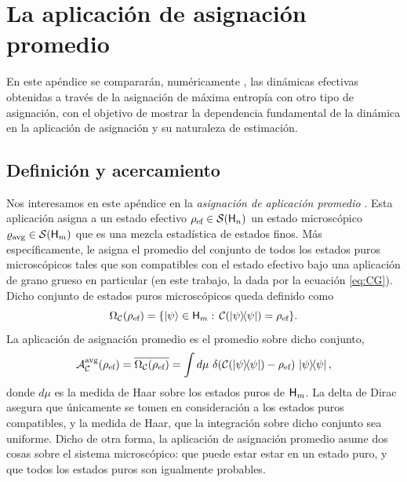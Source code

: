 \chapter{La aplicación de asignación promedio}\label{sec:AVG}

En este apéndice se compararán, numéricamente , las dinámicas efectivas obtenidas a través de la asignación de máxima entropía con otro tipo de asignación, con el objetivo de mostrar la dependencia fundamental de la dinámica en la aplicación de asignación y su naturaleza de estimación.

\section{Definición y acercamiento}




Nos interesamos en este apéndice en la \textit{asignación de aplicación promedio} \cite{Macro-To-Micro}. Esta aplicación asigna a un estado efectivo $\rho_{\text{ef}} \in \mathcal{S}({\sf H}_{n})$ un estado microscópico $\varrho_{\text{avg}} \in \mathcal{S}({\sf H}_{m})$ que es una mezcla estadística de estados finos. Más específicamente, le asigna el promedio del conjunto de todos los estados puros microscópicos tales que son compatibles con el estado efectivo bajo una aplicación de grano grueso en particular (en este trabajo, la dada por la ecuación \ref{eq:CG}). Dicho conjunto de estados puros microscópicos queda definido como
\begin{equation}\label{eq:Omega}
    \Omega_{\mcC}(\rho_{\ef}) = \{\ket{\psi}\in\hilbert_{m}:\, \mcC(\dyad{\psi}) = \rho_{\ef}  \}.
\end{equation}
La aplicación de asignación promedio es el promedio sobre dicho conjunto, \ie 
\begin{equation}\label{eq:AvgMap}
    \mcA_{\mcC}^{\avg}(\rho_{\ef}) = \overline{\Omega_{\mcC}(\rho_{\ef})} = \int d \mu\,\, \delta(\mcC(\dyad{\psi})-\rho_{\ef})\,\dyad{\psi},
\end{equation}
donde $d\mu$ es la medida de Haar sobre los estados puros de ${\sf H}_{m}$. La delta de Dirac asegura que únicamente se tomen en consideración a los estados puros compatibles, y la medida de Haar, que la integración sobre dicho conjunto sea uniforme. Dicho de otra forma, la aplicación de asignación promedio asume dos cosas sobre el sistema microscópico: que puede estar estar en un estado puro, y que todos los estados puros son igualmente probables.

